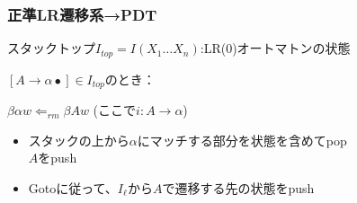 \documentclass[dvipdfmx]{beamer}
\begin{document}
\begin{frame}
  \frametitle{正準LR遷移系→PDT}
  スタックトップ$I_{top}=I(X_1\ldots X_n)$:LR(0)オートマトンの状態
  \begin{trivlist}
    \item [{\bf 還元}]
    $[A\rightarrow\alpha\bullet]\in I_{top}$のとき：


    $\beta\alpha w\Leftarrow_{rm}\beta Aw$ (ここで$i:A\rightarrow\alpha$)


    {\small
        \begin{itemize}
          \item<2> スタックの上から$\alpha$にマッチする部分を状態を含めてpop\\
                $A$をpush
          \item<3> Gotoに従って、$I_\ell$から$A$で遷移する先の状態をpush
        \end{itemize}
      }


\end{trivlist}
\end{frame}
\end{document}
